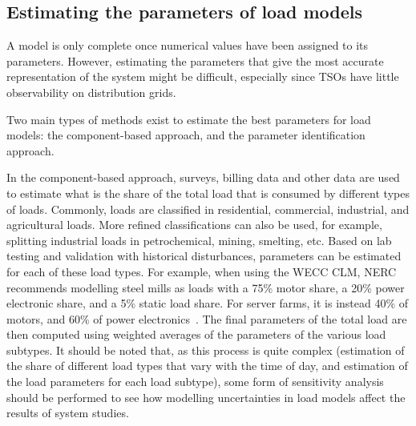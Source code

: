 


\subsection{Estimating the parameters of load models}
\label{sec:load_parameters}

A model is only complete once numerical values have been assigned to its parameters. However, estimating the parameters that give the most accurate representation of the system might be difficult, especially since TSOs have little observability on distribution grids.



Two main types of methods exist to estimate the best parameters for load models: the component-based approach, and the parameter identification approach.

In the component-based approach, surveys, billing data and other data are used to estimate what is the share of the total load that is consumed by different types of loads. Commonly, loads are classified in residential, commercial, industrial, and agricultural loads. More refined classifications can also be used, for example, splitting industrial loads in petrochemical, mining, smelting, etc. Based on lab testing and validation with historical disturbances, parameters can be estimated for each of these load types. For example, when using the WECC CLM, NERC recommends modelling steel mills as loads with a 75\% motor share, a 20\% power electronic share, and a 5\% static load share. For server farms, it is instead 40\% of motors, and 60\% of power electronics~\cite{component_based}. The final parameters of the total load are then computed using weighted averages of the parameters of the various load subtypes. It should be noted that, as this process is quite complex (estimation of the share of different load types that vary with the time of day, and estimation of the load parameters for each load subtype), some form of sensitivity analysis should be performed to see how modelling uncertainties in load models affect the results of system studies.


